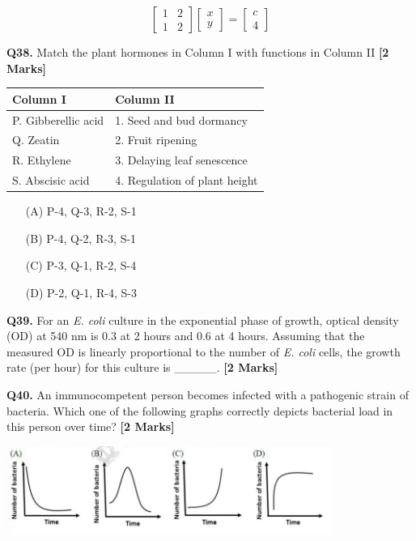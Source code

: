 \documentclass[11pt]{article}
\newcommand{\questionb}[2]{
    \noindent\textbf{Q#2.} #1 \hfill \textbf{[2 Marks]}
}
\begin{document}
\[
\begin{bmatrix}
1 & 2 \\
1 & 2 
\end{bmatrix}
\begin{bmatrix}
x \\
y 
\end{bmatrix}
= 
\begin{bmatrix}
c \\
4 
\end{bmatrix}
\]

\vspace{0.5cm}

\questionb{Match the plant hormones in Column I with functions in Column II}{38}

\begin{tabularx}{\linewidth}{|l|X|}
\hline
\textbf{Column I} & \textbf{Column II} \\
\hline
P. Gibberellic acid & 1. Seed and bud dormancy \\
Q. Zeatin & 2. Fruit ripening \\
R. Ethylene & 3. Delaying leaf senescence \\
S. Abscisic acid & 4. Regulation of plant height \\
\hline
\end{tabularx}

\begin{enumerate}
    \item[(A)] P-4, Q-3, R-2, S-1
    \item[(B)] P-4, Q-2, R-3, S-1  
    \item[(C)] P-3, Q-1, R-2, S-4
    \item[(D)] P-2, Q-1, R-4, S-3
\end{enumerate}

\vspace{0.5cm}

\questionb{For an \textit{E. coli} culture in the exponential phase of growth, optical density (OD) at 540 nm is 0.3 at 2 hours and 0.6 at 4 hours. Assuming that the measured OD is linearly proportional to the number of \textit{E. coli} cells, the growth rate (per hour) for this culture is \_\_\_\_\_.}{39}

\vspace{0.5cm}

\questionb{An immunocompetent person becomes infected with a pathogenic strain of bacteria. Which one of the following graphs correctly depicts bacterial load in this person over time?}{40}

\begin{center}
\includegraphics[width=0.8\textwidth]{figures/40.png}
\end{center}
\end{document}
